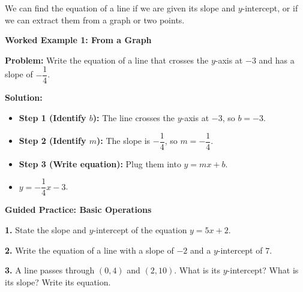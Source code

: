 \documentclass[12pt, letterpaper, fleqn]{article}
\begin{document}
\noindent
We can find the equation of a line if we are given its slope and $y$-intercept, or if we can extract them from a graph or two points.

\vspace{3mm}

\begin{tcolorbox}[colback=white, colframe=black!25, boxrule=0.6pt, arc=4mm, left=6mm, right=6mm, top=5mm, bottom=5mm]

\textbf{Worked Example 1: From a Graph}

\medskip

\textbf{Problem:} Write the equation of a line that crosses the $y$-axis at $-3$ and has a slope of $-\dfrac{1}{4}$.

\medskip

\textbf{Solution:}
\begin{itemize}
    \item \textbf{Step 1 (Identify $b$):} The line crosses the $y$-axis at $-3$, so $b = -3$.
    \item \textbf{Step 2 (Identify $m$):} The slope is $-\dfrac{1}{4}$, so $m = -\dfrac{1}{4}$.
    \item \textbf{Step 3 (Write equation):} Plug them into $y = mx + b$. 
    \item $y = -\dfrac{1}{4}x - 3$.
\end{itemize}

\end{tcolorbox}

\vspace{4mm}

\begin{tcolorbox}[colback=white!15, colframe=black, boxrule=1.5pt, arc=4mm, left=6mm, right=6mm, top=5mm, bottom=5mm]

\textbf{Guided Practice: Basic Operations}

\medskip

\noindent
\textbf{1.} State the slope and $y$-intercept of the equation $y = 5x + 2$.
\vspace{1.5cm}

\noindent
\textbf{2.} Write the equation of a line with a slope of $-2$ and a $y$-intercept of $7$.
\vspace{1.5cm}

\noindent
\textbf{3.} A line passes through $(0, 4)$ and $(2, 10)$. What is its $y$-intercept? What is its slope? Write its equation.
\vspace{2.5cm}

\end{tcolorbox}
\end{document}

